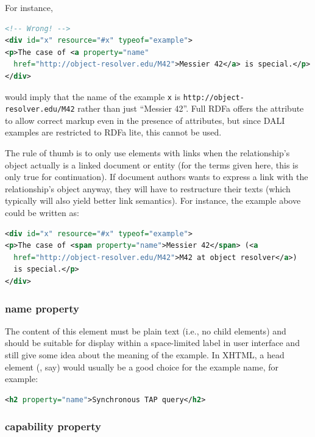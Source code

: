 \documentclass[11pt,letter]{ivoa}
\begin{document}
For instance,

\begin{lstlisting}[language=XML]
<!-- Wrong! -->
<div id="x" resource="#x" typeof="example">
<p>The case of <a property="name" 
  href="http://object-resolver.edu/M42">Messier 42</a> is special.</p>
</div>
\end{lstlisting}

would imply that the name of the example \texttt{x} is
\nolinkurl{http://object-resolver.edu/M42} rather than just ``Messier
42''.  Full RDFa offers the  attribute to allow correct
markup even in the presence of  attributes, but since DALI
examples are restricted to RDFa lite, this cannot be used.

The rule of thumb is to only use elements with links when the
relationship's object actually is a linked document or entity (for the
terms given here, this is only true for continuation).  If document
authors wants to express a link with the relationship's object anyway,
they will have to restructure their texts (which typically will also
yield better link semantics).  For instance, the example above could be
written as:

\begin{lstlisting}[language=XML]
<div id="x" resource="#x" typeof="example">
<p>The case of <span property="name">Messier 42</span> (<a
  href="http://object-resolver.edu/M42">M42 at object resolver</a>)
  is special.</p>
</div>
\end{lstlisting}

\subsubsection{name property}

The content of this element must be plain text (i.e., no child
elements) and
should be suitable for display within a 
space-limited label in user interface and still give some idea about the meaning 
of the example.  In XHTML, a head element (, say) would usually be a good 
choice for the example name, for example:

\begin{lstlisting}[language=XML]
<h2 property="name">Synchronous TAP query</h2>
\end{lstlisting}

\subsubsection{capability property}
\end{document}
